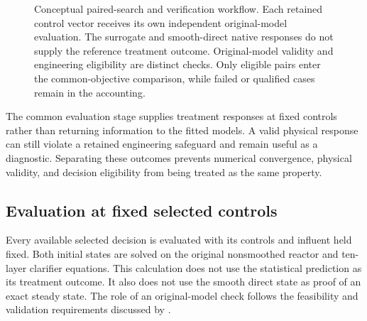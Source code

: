 \begin{figure}[htbp]
\caption{Conceptual paired-search and verification workflow. Each retained control vector receives its own independent original-model evaluation. The surrogate and smooth-direct native responses do not supply the reference treatment outcome. Original-model validity and engineering eligibility are distinct checks. Only eligible pairs enter the common-objective comparison, while failed or qualified cases remain in the accounting.}
\label{fig:plant_route_verification}
\end{figure}

The common evaluation stage supplies treatment responses at fixed controls rather than returning information to the fitted models. A valid physical response can still violate a retained engineering safeguard and remain useful as a diagnostic. Separating these outcomes prevents numerical convergence, physical validity, and decision eligibility from being treated as the same property.

\subsection{Evaluation at fixed selected controls}

Every available selected decision is evaluated with its controls and influent held fixed. Both initial states are solved on the original nonsmoothed reactor and ten-layer clarifier equations. This calculation does not use the statistical prediction as its treatment outcome. It also does not use the smooth direct state as proof of an exact steady state. The role of an original-model check follows the feasibility and validation requirements discussed by \citet{BhosekarIerapetritou2018}.

